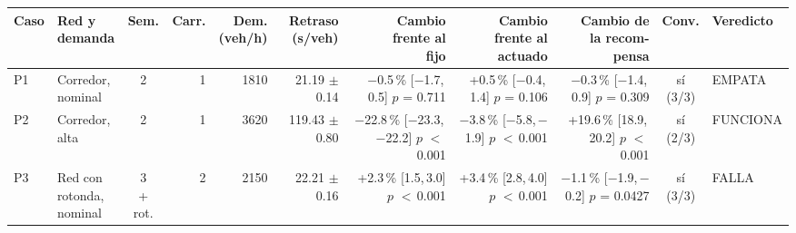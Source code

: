 \begin{table}[H]
\centering
\scriptsize
\setlength{\tabcolsep}{1.5pt}
\begin{tabular}{llcrrrrrrcl}
\toprule
Caso & \makecell[l]{Red y\\demanda} & Sem. & Carr. & \makecell{Dem.\\(veh/h)} & \makecell{Retraso\\(s/veh)} & \makecell{Cambio\\frente al\\fijo} & \makecell{Cambio\\frente al\\actuado} & \makecell{Cambio de\\la recom-\\pensa} & Conv. & Veredicto \\
\midrule
P1 & \makecell[l]{Corredor,\\{}nominal} & 2 & 1 & 1810 & \makecell[r]{21.19\\{}$\pm$ 0.14} & \makecell[r]{$-$0.5\,\%\\{}[$-$1.7,\,0.5]\\$p$ = 0.711} & \makecell[r]{+0.5\,\%\\{}[$-$0.4,\,1.4]\\$p$ = 0.106} & \makecell[r]{$-$0.3\,\%\\{}[$-$1.4,\,0.9]\\$p$ = 0.309} & \makecell[c]{sí\\{}(3/3)} & EMPATA \\
P2 & \makecell[l]{Corredor,\\{}alta} & 2 & 1 & 3620 & \makecell[r]{119.43\\{}$\pm$ 0.80} & \makecell[r]{$-$22.8\,\%\\{}[$-$23.3,\,$-$22.2]\\$p$ $<$\,0.001} & \makecell[r]{$-$3.8\,\%\\{}[$-$5.8,\,$-$1.9]\\$p$ $<$\,0.001} & \makecell[r]{+19.6\,\%\\{}[18.9,\,20.2]\\$p$ $<$\,0.001} & \makecell[c]{sí\\{}(2/3)} & FUNCIONA \\
P3 & \makecell[l]{Red con\\{}rotonda,\\{}nominal} & \makecell[c]{3\\{}+ rot.} & 2 & 2150 & \makecell[r]{22.21\\{}$\pm$ 0.16} & \makecell[r]{+2.3\,\%\\{}[1.5,\,3.0]\\$p$ $<$\,0.001} & \makecell[r]{+3.4\,\%\\{}[2.8,\,4.0]\\$p$ $<$\,0.001} & \makecell[r]{$-$1.1\,\%\\{}[$-$1.9,\,$-$0.2]\\$p$ = 0.0427} & \makecell[c]{sí\\{}(3/3)} & FALLA \\

\end{tabular}
\end{table}
